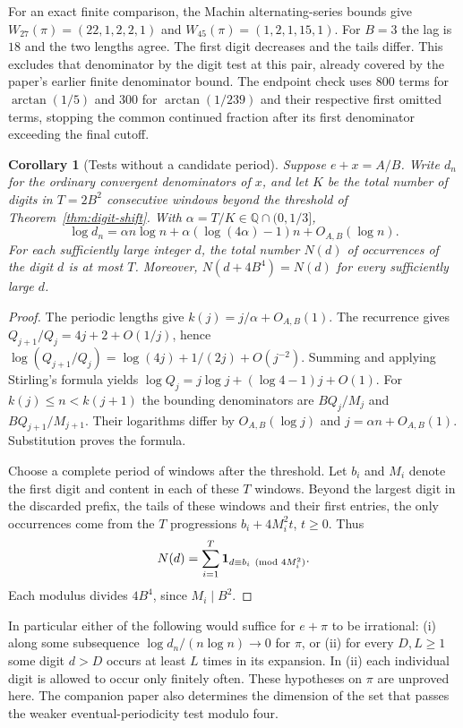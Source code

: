\documentclass[11pt]{amsart}
\newtheorem{corollary}[theorem]{Corollary}
\theoremstyle{definition}
\theoremstyle{remark}
\numberwithin{equation}{section}
\begin{document}
For an exact finite comparison, the Machin alternating-series bounds
give $W_{27}(\pi)=(22,1,2,2,1)$ and $W_{45}(\pi)=(1,2,1,15,1)$.
For $B=3$ the lag is $18$ and the two lengths agree.
The first digit decreases and the tails differ. This excludes that
denominator by the digit test at this pair, already covered by the
paper's earlier finite denominator bound. The endpoint check uses
800 terms for $\arctan(1/5)$ and 300 for $\arctan(1/239)$ and their
respective first omitted terms, stopping the common continued fraction
after its first denominator exceeding the final cutoff.
\begin{corollary}[Tests without a candidate period]\label{cor:digit-statistics}
Suppose $e+x=A/B$. Write $d_n$ for the ordinary convergent denominators
of $x$, and let $K$ be the total number of digits in $T=2B^2$
consecutive windows beyond the threshold of Theorem~\ref{thm:digit-shift}.
With $\alpha=T/K\in\mathbb Q\cap(0,1/3]$,
\[
 \log d_n=\alpha n\log n+
       \alpha(\log(4\alpha)-1)n+O_{A,B}(\log n).
\]
For each sufficiently large integer $d$, the total number $N(d)$ of
occurrences of the digit $d$ is at most $T$. Moreover,
$N(d+4B^4)=N(d)$ for every sufficiently large $d$.
\end{corollary}
\begin{proof}
The periodic lengths give $k(j)=j/\alpha+O_{A,B}(1)$.
The recurrence gives $Q_{j+1}/Q_j=4j+2+O(1/j)$, hence
$\log(Q_{j+1}/Q_j)=\log(4j)+1/(2j)+O(j^{-2})$.
Summing and applying Stirling's formula yields
$\log Q_j=j\log j+(\log4-1)j+O(1)$.
For $k(j)\le n<k(j+1)$ the bounding denominators are
$BQ_j/M_j$ and $BQ_{j+1}/M_{j+1}$. Their logarithms differ by
$O_{A,B}(\log j)$ and $j=\alpha n+O_{A,B}(1)$.
Substitution proves the formula.

Choose a complete period of windows after the threshold. Let $b_i$
and $M_i$ denote the first digit and content in each of these $T$
windows. Beyond the largest digit in the discarded prefix, the tails
of these windows and their first entries, the only occurrences come
from the $T$ progressions $b_i+4M_i^2t$, $t\ge0$. Thus
\[
 N(d)=\sum_{i=1}^T {\bf1}_{d\equiv b_i\pmod {4M_i^2}}.
\]
Each modulus divides $4B^4$, since $M_i\mid B^2$.
\end{proof}
In particular either of the following would suffice for $e+\pi$ to be
irrational: (i) along some subsequence $\log d_n/(n\log n)\to0$ for
$\pi$, or (ii) for every $D,L\ge1$ some digit $d>D$ occurs at least
$L$ times in its expansion. In (ii) each individual digit is allowed
to occur only finitely often. These hypotheses on $\pi$ are unproved
here. The companion paper also determines the dimension of the set
that passes the weaker eventual-periodicity test modulo four.
\end{document}
